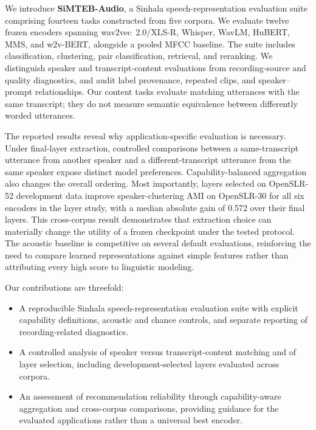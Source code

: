 We introduce \textbf{SiMTEB-Audio}, a Sinhala speech-representation evaluation suite comprising fourteen tasks constructed from five corpora. We evaluate twelve frozen encoders spanning wav2vec~2.0/XLS-R, Whisper, WavLM, HuBERT, MMS, and w2v-BERT, alongside a pooled MFCC baseline. The suite includes classification, clustering, pair classification, retrieval, and reranking. We distinguish speaker and transcript-content evaluations from recording-source and quality diagnostics, and audit label provenance, repeated clips, and speaker--prompt relationships. Our content tasks evaluate matching utterances with the same transcript; they do not measure semantic equivalence between differently worded utterances.

The reported results reveal why application-specific evaluation is necessary. Under final-layer extraction, controlled comparisons between a same-transcript utterance from another speaker and a different-transcript utterance from the same speaker expose distinct model preferences. Capability-balanced aggregation also changes the overall ordering. Most importantly, layers selected on OpenSLR-52 development data improve speaker-clustering AMI on OpenSLR-30 for all six encoders in the layer study, with a median absolute gain of 0.572 over their final layers. This cross-corpus result demonstrates that extraction choice can materially change the utility of a frozen checkpoint under the tested protocol. The acoustic baseline is competitive on several default evaluations, reinforcing the need to compare learned representations against simple features rather than attributing every high score to linguistic modeling.

Our contributions are threefold:
\begin{itemize}
    \item A reproducible Sinhala speech-representation evaluation suite with explicit capability definitions, acoustic and chance controls, and separate reporting of recording-related diagnostics.
    \item A controlled analysis of speaker versus transcript-content matching and of layer selection, including development-selected layers evaluated across corpora.
    \item An assessment of recommendation reliability through capability-aware aggregation and cross-corpus comparisons, providing guidance for the evaluated applications rather than a universal best encoder.
\end{itemize}

